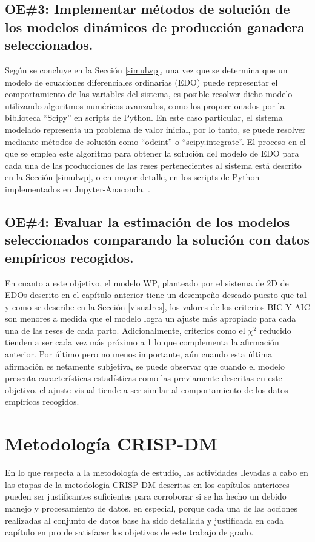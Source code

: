 \subsection{OE\#3: Implementar métodos de solución de los modelos dinámicos de producción ganadera seleccionados.}

Según se concluye en la Sección \ref{simulwp}, una vez que se determina que un modelo de ecuaciones diferenciales ordinarias (EDO) puede representar el comportamiento de las variables del sistema, es posible resolver dicho modelo utilizando algoritmos numéricos avanzados, como los proporcionados por la biblioteca ``Scipy'' en scripts de Python. En este caso particular, el sistema modelado representa un problema de valor inicial, por lo tanto, se puede resolver mediante métodos de solución como ``odeint'' o ``scipy.integrate''. El proceso en el que se emplea este algoritmo para obtener la solución del modelo de EDO para cada una de las producciones de las reses pertenecientes al sistema está descrito en la Sección \ref{simulwp}, o en mayor detalle, en los scripts de Python implementados en Jupyter-Anaconda. \cite{msclfggprogrepo}.


\subsection{OE\#4: Evaluar la estimación de los modelos seleccionados comparando la solución con datos empíricos recogidos.}

En cuanto a este objetivo, el modelo WP, planteado por el sistema de 2D de EDOs descrito en el capítulo anterior tiene un desempeño deseado puesto que tal y como se describe en la Sección \ref{visualres}, los valores de los criterios BIC Y AIC son menores a medida que el modelo logra un ajuste más apropiado para cada una de las reses de cada parto. Adicionalmente, criterios como el $\chi^{2}$ reducido tienden a ser cada vez más próximo a 1 lo que complementa la afirmación anterior. Por último pero no menos importante, aún cuando esta última afirmación es netamente subjetiva, se puede observar que  cuando el modelo presenta características estadísticas como las previamente descritas en este objetivo, el ajuste visual tiende a ser similar al comportamiento de los datos empíricos recogidos.

\section{Metodología CRISP-DM}

En lo que respecta a la metodología de estudio, las actividades llevadas a cabo en las etapas de la metodología CRISP-DM descritas en los capítulos anteriores pueden ser justificantes suficientes para corroborar si se ha hecho un debido manejo y procesamiento de datos, en especial, porque cada una de las acciones realizadas al conjunto de datos base ha sido detallada y justificada en cada capítulo en pro de satisfacer los objetivos de este trabajo de grado.\\

